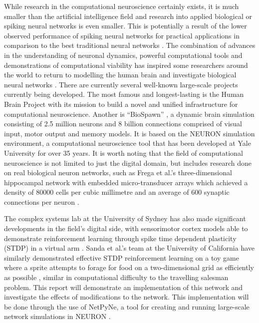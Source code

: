 \documentclass[11pt, twocolumn]{article}
\begin{document}
While research in the computational neuroscience certainly exists, it is much smaller than the artificial intelligence field and research into applied biological or spiking neural networks is even smaller. This is potentially a result of the lower observed performance of spiking neural networks for practical applications in comparison to the best traditional neural networks \cite{schmidhuber2015deep}. The combination of advances in the understanding of neuronal dynamics, powerful computational tools and demonstrations of computational viability \cite{zenke2014limits} has inspired some researchers around the world to return to modelling the human brain and investigate biological neural networks \cite{ashby2011tutorial}\cite{ashby2005frost}\cite{frank2005dynamic}\cite{hartley2006understanding}\cite{leveille2010running}. There are currently several well-known large-scale projects currently being developed. The most famous and longest-lasting is the Human Brain Project \cite{markram2015reconstruction} with its mission to build a novel and unified infrastructure for computational neuroscience. Another is ``BioSpawn'' \cite{eliasmith2016biospaun}, a dynamic brain simulation consisting of 2.5 million neurons and 8 billion connections comprised of visual input, motor output and memory models. It is based on the NEURON simulation environment, a computational neuroscience tool that has been developed at Yale University for over 35 years. It is worth noting that the field of computational neuroscience is not limited to just the digital domain, but includes research done on real biological neuron networks, such as Frega et al.'s three-dimensional hippocampal network with embedded micro-transducer arrays which achieved a density of 80000 cells per cubic millimetre and an average of 600 synaptic connections per neuron \cite{frega2014network}.

The complex systems lab at the University of Sydney has also made significant developments in the field's digital side, with sensorimotor cortex models able to demonstrate reinforcement learning through spike time dependent plasticity (\acs{STDP}) in a virtual arm \cite{neymotin2013reinforcement}\cite{dura2017evolutionary}. Sanda et al.'s team at the University of California have similarly demonstrated effective \acs{STDP} reinforcement learning on a toy game where a sprite attempts to forage for food on a two-dimensional grid as efficiently as possible \cite{sanda2017multi}, similar in computational difficulty to the travelling salesman problem. This report will demonstrate an implementation of this network and investigate the effects of modifications to the network. This implementation will be done through the use of NetPyNe, a tool for creating and running large-scale network simulations in NEURON \cite{dura2018netpyne}.
\end{document}
